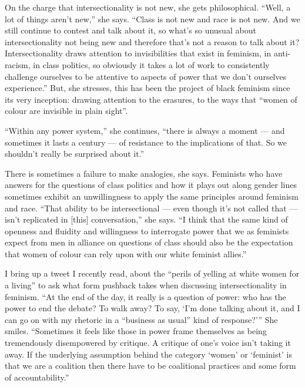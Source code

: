 \documentclass{article}
\begin{document}
On the charge that intersectionality is not new, she gets philosophical.
``Well, a lot of things aren't new,'' she says. ``Class is not new and race is
not new.  And we still continue to contest and talk about it, so what's so
unusual about intersectionality not being new and therefore that's not a reason
to talk about it? Intersectionality draws attention to invisibilities that
exist in feminism, in anti-racism, in class politics, so obviously it takes a
lot of work to consistently challenge ourselves to be attentive to aspects of
power that we don't ourselves experience.''  But, she stresses, this has been
the project of black feminism since its very inception: drawing attention to
the erasures, to the ways that ``women of colour are invisible in plain
sight''.

``Within any power system,'' she continues, ``there is always a moment --- and
sometimes it lasts a century --- of resistance to the implications of that. So
we shouldn't really be surprised about it.''

There is sometimes a failure to make analogies, she says. Feminists who have
answers for the questions of class politics and how it plays out along gender
lines sometimes exhibit an unwillingness to apply the same principles around
feminism and race. ``That ability to be intersectional --- even though it's not
called that --- isn't replicated in [this] conversation,'' she says. ``I think
that the same kind of openness and fluidity and willingness to interrogate
power that we as feminists expect from men in alliance on questions of class
should also be the expectation that women of colour can rely upon with our
white feminist allies.''

I bring up a tweet I recently read, about the ``perils of yelling at white
women for a living'' to ask what form pushback takes when discussing
intersectionality in feminism. ``At the end of the day, it really is a question
of power: who has the power to end the debate? To walk away? To say, `I'm done
talking about it, and I can go on with my rhetoric in a ``business as usual''
kind of response?''' She smiles. ``Sometimes it feels like those in power frame
themselves as being tremendously disempowered by critique. A critique of one's
voice isn't taking it away. If the underlying assumption behind the category
`women' or `feminist' is that we are a coalition then there have to be
coalitional practices and some form of accountability.''
\end{document}
